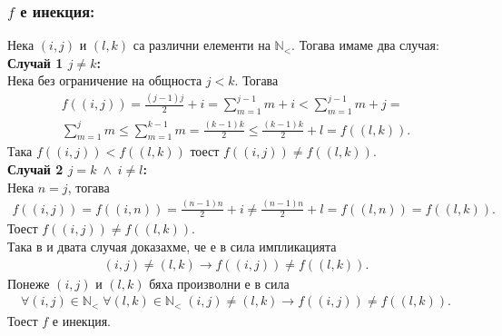 \documentclass[a4paper, 12pt, oneside]{article}
\newcommand{\N}{\mathbb{N}}
\newcommand{\LN}{\N_<}
\begin{document}
\subsubsection*{\(f\) е инекция:}
Нека \((i, j)\) и \((l, k)\) са различни елементи на \(\LN\).
Тогава имаме два случая: \\
\textbf{Случай 1 \(j \neq k\):} \\
Нека без ограничение на общноста \(j < k\). Тогава
\begin{align*}
    f((i, j)) = \displaystyle\frac{(j - 1)j}{2} + i = \displaystyle\sum_{m = 1}^{j - 1} m  + i < \displaystyle\sum_{m = 1}^{j - 1} m + j = \\
    \displaystyle\sum_{m = 1}^j m \leq \displaystyle\sum_{m = 1}^{k - 1} m = \displaystyle\frac{(k - 1)k}{2} \leq \displaystyle\frac{(k - 1)k}{2} + l = f((l, k)).
\end{align*}
Така \(f((i, j)) < f((l, k))\) тоест \(f((i, j)) \neq f((l, k))\). \\
\textbf{Случай 2 \(j = k \; \land \; i \neq l\):} \\
Нека \(n = j\), тогава
\begin{align*}
    f((i, j)) = f((i, n)) = \displaystyle\frac{(n - 1)n}{2} + i \neq \displaystyle\frac{(n - 1)n}{2} + l = f((l, n)) = f((l, k)).
\end{align*}
Тоест \(f((i, j)) \neq f((l, k))\). \\
Така в и двата случая доказахме, че е в сила импликацията
\begin{align*}
    (i, j) \neq (l, k) \longrightarrow f((i, j)) \neq f((l, k)).
\end{align*}
Понеже \((i, j)\) и \((l, k)\) бяха произволни е в сила
\begin{align*}
    \forall (i, j) \in \LN \; \forall (l, k) \in \LN \; (i, j) \neq (l, k) \longrightarrow f((i, j)) \neq f((l, k)).
\end{align*}
Тоест \(f\) е инекция.
\end{document}
